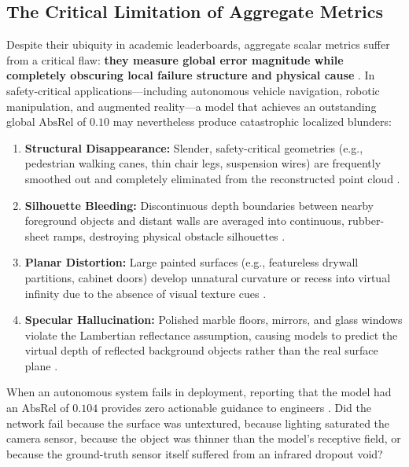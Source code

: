 \documentclass[11pt,a4paper]{article}
\begin{document}
\subsection{The Critical Limitation of Aggregate Metrics}
Despite their ubiquity in academic leaderboards, aggregate scalar metrics suffer from a critical flaw: \textbf{they measure global error magnitude while completely obscuring local failure structure and physical cause} \citep{chawla2021error,singla2021understanding}. In safety-critical applications—including autonomous vehicle navigation, robotic manipulation, and augmented reality—a model that achieves an outstanding global $\text{AbsRel}$ of $0.10$ may nevertheless produce catastrophic localized blunders:
\begin{enumerate}
    \item \textbf{Structural Disappearance:} Slender, safety-critical geometries (e.g., pedestrian walking canes, thin chair legs, suspension wires) are frequently smoothed out and completely eliminated from the reconstructed point cloud \citep{kong2023robodepth}.
    \item \textbf{Silhouette Bleeding:} Discontinuous depth boundaries between nearby foreground objects and distant walls are averaged into continuous, rubber-sheet ramps, destroying physical obstacle silhouettes \citep{ranftl2021vision}.
    \item \textbf{Planar Distortion:} Large painted surfaces (e.g., featureless drywall partitions, cabinet doors) develop unnatural curvature or recess into virtual infinity due to the absence of visual texture cues \citep{yang2024depthanythingv2}.
    \item \textbf{Specular Hallucination:} Polished marble floors, mirrors, and glass windows violate the Lambertian reflectance assumption, causing models to predict the virtual depth of reflected background objects rather than the real surface plane \citep{roberts2021hypersim}.
\end{enumerate}

When an autonomous system fails in deployment, reporting that the model had an $\text{AbsRel}$ of $0.104$ provides zero actionable guidance to engineers \citep{zhang2019manifold,spinner2024innspector}. Did the network fail because the surface was untextured, because lighting saturated the camera sensor, because the object was thinner than the model's receptive field, or because the ground-truth sensor itself suffered from an infrared dropout void?
\end{document}
